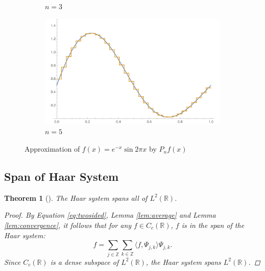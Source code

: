 \documentclass[11pt]{amsart}
\theoremstyle{theorem} %
\newtheorem{thm}{Theorem}[section] %
\theoremstyle{definition}
\theoremstyle{example}
\theoremstyle{remark}
\numberwithin{equation}{section}
\newcommand{\R}{\mathbb{R}}
\newcommand{\Z}{\mathbb{Z}}
\begin{document}
\begin{figure}[h]
\begin{subfigure}[b]{0.475\textwidth}
		\caption[]%
		{{\small $ n = 3 $}}    
	\end{subfigure}
	\quad
	\begin{subfigure}[b]{0.475\textwidth}   
		\centering 
		\includegraphics[width=\textwidth]{img/e5}
		\caption[]%
		{{\small $ n = 5 $}}    
	\end{subfigure}
	\caption[]
	{Approximation of $ f(x) = e^{-x} \sin{2\pi x} $ by $ P_nf(x) $}
	\label{fig:converge}
\end{figure}


\subsection{Span of Haar System}

\begin{thm}[{\cite[411]{davidson}}] \label{span}
	The Haar system spans all of $ L^2(\R) $.
	
	\begin{proof}
		By Equation \ref{eq:twosided}, Lemma \ref{lem:average} and Lemma \ref{lem:convergence}, it follows that for any $ f \in C_c(\R) $, $ f $ is in the span of the Haar system:
		\[
			f = \sum_{j \in \Z} \sum_{k \in \Z} \langle f, \varPsi_{j,k} \rangle \varPsi_{j,k}.
		\]
		Since $ C_c(\R) $ is a dense subspace of $ L^2(\R) $, the Haar system spans $ L^2(\R) $.
%		
%		
	\end{proof}
\end{thm}
\end{document}
